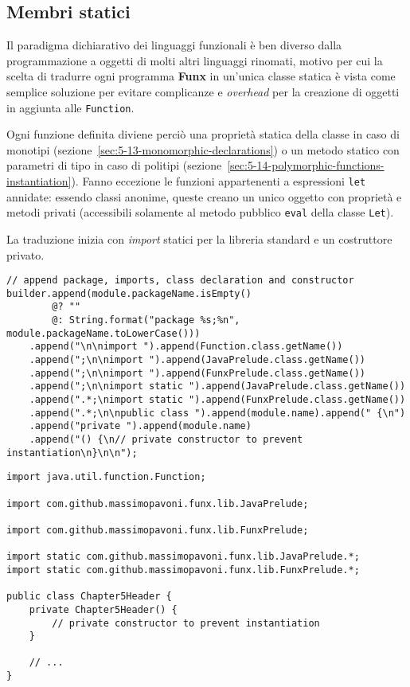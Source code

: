 \subsection{Membri statici}
\label{sec:5-11-static-members}

Il paradigma dichiarativo dei linguaggi funzionali è ben diverso dalla programmazione a oggetti di molti altri linguaggi rinomati,
motivo per cui la scelta di tradurre ogni programma \textbf{Funx} in un'unica classe statica è vista come semplice soluzione
per evitare complicanze e \textit{overhead} per la creazione di oggetti in aggiunta alle \texttt{Function}.


Ogni funzione definita diviene perciò una proprietà statica della classe in caso di monotipi (sezione~\ref{sec:5-13-monomorphic-declarations})
o un metodo statico con parametri di tipo in caso di politipi (sezione~\ref{sec:5-14-polymorphic-functions-instantiation}).
Fanno eccezione le funzioni appartenenti a espressioni \texttt{let} annidate: essendo classi anonime, queste creano
un unico oggetto con proprietà e metodi privati (accessibili solamente al metodo pubblico \texttt{eval} della classe \texttt{Let}).

\noindent La traduzione inizia con \textit{import} statici per la libreria standard e un costruttore privato.

\vspace{4mm}
\begin{lstlisting}[caption={Prime aggiunte alla stringa \texttt{Java}}, style=javaCode, label={lst:5-11-first-append-java}]
// append package, imports, class declaration and constructor
builder.append(module.packageName.isEmpty()
        @? ""
        @: String.format("package %s;%n", module.packageName.toLowerCase()))
    .append("\n\nimport ").append(Function.class.getName())
    .append(";\n\nimport ").append(JavaPrelude.class.getName())
    .append(";\n\nimport ").append(FunxPrelude.class.getName())
    .append(";\n\nimport static ").append(JavaPrelude.class.getName())
    .append(".*;\nimport static ").append(FunxPrelude.class.getName())
    .append(".*;\n\npublic class ").append(module.name).append(" {\n")
    .append("private ").append(module.name)
    .append("() {\n// private constructor to prevent instantiation\n}\n\n");
\end{lstlisting}
\vspace{4mm}
\begin{lstlisting}[caption={Corrispondente codice \texttt{Java} generato}, style=javaCode, label={lst:5-11-class-start-java}]
import java.util.function.Function;

import com.github.massimopavoni.funx.lib.JavaPrelude;

import com.github.massimopavoni.funx.lib.FunxPrelude;

import static com.github.massimopavoni.funx.lib.JavaPrelude.*;
import static com.github.massimopavoni.funx.lib.FunxPrelude.*;

public class Chapter5Header {
    private Chapter5Header() {
        // private constructor to prevent instantiation
    }

    // ...
}
\end{lstlisting}